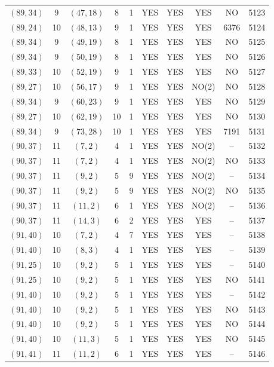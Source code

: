 \begin{longtable}{|c|c|c|c|c|c|c|c|c|c|}
$(89, 34)$ & 9 & $(47, 18)$ & 8 & 1 & YES & YES & YES & NO & 5123\\
$(89, 24)$ & 10 & $(48, 13)$ & 9 & 1 & YES & YES & YES & 6376 & 5124\\
$(89, 34)$ & 9 & $(49, 19)$ & 8 & 1 & YES & YES & YES & NO & 5125\\
$(89, 34)$ & 9 & $(50, 19)$ & 8 & 1 & YES & YES & YES & NO & 5126\\
$(89, 33)$ & 10 & $(52, 19)$ & 9 & 1 & YES & YES & YES & NO & 5127\\
$(89, 27)$ & 10 & $(56, 17)$ & 9 & 1 & YES & YES & NO(2) & NO & 5128\\
$(89, 34)$ & 9 & $(60, 23)$ & 9 & 1 & YES & YES & YES & NO & 5129\\
$(89, 27)$ & 10 & $(62, 19)$ & 10 & 1 & YES & YES & YES & NO & 5130\\
$(89, 34)$ & 9 & $(73, 28)$ & 10 & 1 & YES & YES & YES & 7191 & 5131\\
$(90, 37)$ & 11 & $(7, 2)$ & 4 & 1 & YES & YES & NO(2) & -- & 5132\\
$(90, 37)$ & 11 & $(7, 2)$ & 4 & 1 & YES & YES & NO(2) & NO & 5133\\
$(90, 37)$ & 11 & $(9, 2)$ & 5 & 9 & YES & YES & NO(2) & -- & 5134\\
$(90, 37)$ & 11 & $(9, 2)$ & 5 & 9 & YES & YES & NO(2) & NO & 5135\\
$(90, 37)$ & 11 & $(11, 2)$ & 6 & 1 & YES & YES & NO(2) & -- & 5136\\
$(90, 37)$ & 11 & $(14, 3)$ & 6 & 2 & YES & YES & YES & -- & 5137\\
$(91, 40)$ & 10 & $(7, 2)$ & 4 & 7 & YES & YES & YES & -- & 5138\\
$(91, 40)$ & 10 & $(8, 3)$ & 4 & 1 & YES & YES & YES & -- & 5139\\
$(91, 25)$ & 10 & $(9, 2)$ & 5 & 1 & YES & YES & YES & -- & 5140\\
$(91, 25)$ & 10 & $(9, 2)$ & 5 & 1 & YES & YES & YES & NO & 5141\\
$(91, 40)$ & 10 & $(9, 2)$ & 5 & 1 & YES & YES & YES & -- & 5142\\
$(91, 40)$ & 10 & $(9, 2)$ & 5 & 1 & YES & YES & YES & NO & 5143\\
$(91, 40)$ & 10 & $(9, 2)$ & 5 & 1 & YES & YES & YES & NO & 5144\\
$(91, 40)$ & 10 & $(11, 3)$ & 5 & 1 & YES & YES & YES & NO & 5145\\
$(91, 41)$ & 11 & $(11, 2)$ & 6 & 1 & YES & YES & YES & -- & 5146\\

\end{longtable}
